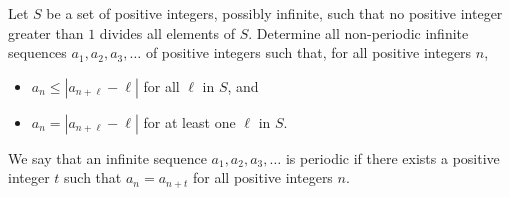Let $S$ be a set of positive integers, possibly infinite, such that no positive integer greater than $1$ divides all elements of $S$. Determine all non-periodic infinite sequences $a_1,a_2,a_3,\ldots$ of positive integers such that, for all positive integers $n$,
\begin{itemize}
\item $a_n\leq |a_{n+\ell}-\ell|$ for all $\ell$ in $S$, and
\item $a_n=|a_{n+\ell}-\ell|$ for at least one $\ell$ in $S$.
\end{itemize}
We say that an infinite sequence $a_1,a_2,a_3,\ldots$ is periodic if there exists a positive integer $t$ such that $a_n=a_{n+t}$ for all positive integers $n$.
